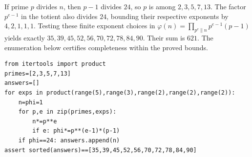If prime $p$ divides $n$, then $p-1$ divides $24$, so $p$ is among $2,3,5,7,13$. The factor $p^{e-1}$ in the totient also divides $24$, bounding their respective exponents by $4,2,1,1,1$. Testing these finite exponent choices in $\varphi(n)=\prod_{p^e\parallel n}p^{e-1}(p-1)$ yields exactly $35,39,45,52,56,70,72,78,84,90$. Their sum is $\boxed{621}$. The enumeration below certifies completeness within the proved bounds.\begin{verbatim}
from itertools import product
primes=[2,3,5,7,13]
answers=[]
for exps in product(range(5),range(3),range(2),range(2),range(2)):
    n=phi=1
    for p,e in zip(primes,exps):
        n*=p**e
        if e: phi*=p**(e-1)*(p-1)
    if phi==24: answers.append(n)
assert sorted(answers)==[35,39,45,52,56,70,72,78,84,90]
\end{verbatim}
